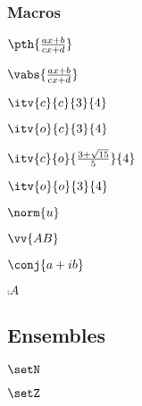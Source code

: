 \subsubsection{Macros}

\begin{latexcodesbs}
    $\pth{\frac{ax+b}{cx+d}}$
\end{latexcodesbs}

\begin{latexcodesbs}
    $\vabs{\frac{ax+b}{cx+d}}$
\end{latexcodesbs}

\begin{latexcodesbs}
    $\itv{c}{c}{3}{4}$
\end{latexcodesbs}

\begin{latexcodesbs}
    $\itv{o}{c}{3}{4}$
\end{latexcodesbs}

\begin{latexcodesbs}
    $\itv{c}{o}{\frac{3+\sqrt{15}}{5}}{4}$
\end{latexcodesbs}

\begin{latexcodesbs}
    $\itv{o}{o}{3}{4}$
\end{latexcodesbs}

\begin{latexcodesbs}
    $\norm{u}$
\end{latexcodesbs}

\begin{latexcodesbs}
    $\vv{AB}$
\end{latexcodesbs}

\begin{latexcodesbs}
    $\conj{a+ib}$
\end{latexcodesbs}

\begin{latexcodesbs}
    $\comp{A}$
\end{latexcodesbs}

\subsection{Ensembles}

\begin{latexcodesbs}
    $\setN$
\end{latexcodesbs}

\begin{latexcodesbs}
    $\setZ$
\end{latexcodesbs}

